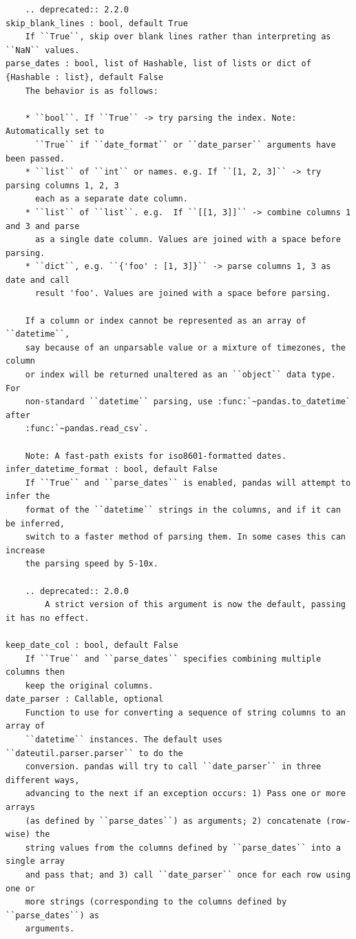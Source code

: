 \documentclass[
  letterpaper,
  DIV=11,
  numbers=noendperiod]{scrreprt}
\begin{document}
\begin{verbatim}
    .. deprecated:: 2.2.0
skip_blank_lines : bool, default True
    If ``True``, skip over blank lines rather than interpreting as ``NaN`` values.
parse_dates : bool, list of Hashable, list of lists or dict of {Hashable : list}, default False
    The behavior is as follows:

    * ``bool``. If ``True`` -> try parsing the index. Note: Automatically set to
      ``True`` if ``date_format`` or ``date_parser`` arguments have been passed.
    * ``list`` of ``int`` or names. e.g. If ``[1, 2, 3]`` -> try parsing columns 1, 2, 3
      each as a separate date column.
    * ``list`` of ``list``. e.g.  If ``[[1, 3]]`` -> combine columns 1 and 3 and parse
      as a single date column. Values are joined with a space before parsing.
    * ``dict``, e.g. ``{'foo' : [1, 3]}`` -> parse columns 1, 3 as date and call
      result 'foo'. Values are joined with a space before parsing.

    If a column or index cannot be represented as an array of ``datetime``,
    say because of an unparsable value or a mixture of timezones, the column
    or index will be returned unaltered as an ``object`` data type. For
    non-standard ``datetime`` parsing, use :func:`~pandas.to_datetime` after
    :func:`~pandas.read_csv`.

    Note: A fast-path exists for iso8601-formatted dates.
infer_datetime_format : bool, default False
    If ``True`` and ``parse_dates`` is enabled, pandas will attempt to infer the
    format of the ``datetime`` strings in the columns, and if it can be inferred,
    switch to a faster method of parsing them. In some cases this can increase
    the parsing speed by 5-10x.

    .. deprecated:: 2.0.0
        A strict version of this argument is now the default, passing it has no effect.

keep_date_col : bool, default False
    If ``True`` and ``parse_dates`` specifies combining multiple columns then
    keep the original columns.
date_parser : Callable, optional
    Function to use for converting a sequence of string columns to an array of
    ``datetime`` instances. The default uses ``dateutil.parser.parser`` to do the
    conversion. pandas will try to call ``date_parser`` in three different ways,
    advancing to the next if an exception occurs: 1) Pass one or more arrays
    (as defined by ``parse_dates``) as arguments; 2) concatenate (row-wise) the
    string values from the columns defined by ``parse_dates`` into a single array
    and pass that; and 3) call ``date_parser`` once for each row using one or
    more strings (corresponding to the columns defined by ``parse_dates``) as
    arguments.


\end{verbatim}
\end{document}
